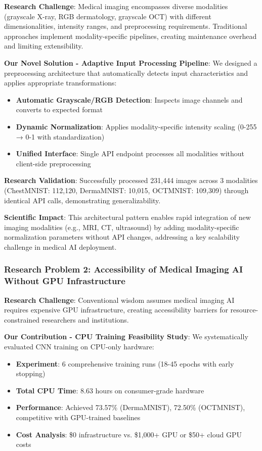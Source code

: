 \documentclass[12pt,a4paper]{article}
\begin{document}
\textbf{Research Challenge}: Medical imaging encompasses diverse modalities (grayscale X-ray, RGB dermatology, grayscale OCT) with different dimensionalities, intensity ranges, and preprocessing requirements. Traditional approaches implement modality-specific pipelines, creating maintenance overhead and limiting extensibility.

\textbf{Our Novel Solution - Adaptive Input Processing Pipeline}: We designed a preprocessing architecture that automatically detects input characteristics and applies appropriate transformations:

\begin{itemize}
    \item \textbf{Automatic Grayscale/RGB Detection}: Inspects image channels and converts to expected format
    \item \textbf{Dynamic Normalization}: Applies modality-specific intensity scaling (0-255 → 0-1 with standardization)
    \item \textbf{Unified Interface}: Single API endpoint processes all modalities without client-side preprocessing
\end{itemize}

\textbf{Research Validation}: Successfully processed 231,444 images across 3 modalities (ChestMNIST: 112,120, DermaMNIST: 10,015, OCTMNIST: 109,309) through identical API calls, demonstrating generalizability.

\textbf{Scientific Impact}: This architectural pattern enables rapid integration of new imaging modalities (e.g., MRI, CT, ultrasound) by adding modality-specific normalization parameters without API changes, addressing a key scalability challenge in medical AI deployment.

\subsubsection{Research Problem 2: Accessibility of Medical Imaging AI Without GPU Infrastructure}

\textbf{Research Challenge}: Conventional wisdom assumes medical imaging AI requires expensive GPU infrastructure, creating accessibility barriers for resource-constrained researchers and institutions.

\textbf{Our Contribution - CPU Training Feasibility Study}: We systematically evaluated CNN training on CPU-only hardware:

\begin{itemize}
    \item \textbf{Experiment}: 6 comprehensive training runs (18-45 epochs with early stopping)
    \item \textbf{Total CPU Time}: 8.63 hours on consumer-grade hardware
    \item \textbf{Performance}: Achieved 73.57\% (DermaMNIST), 72.50\% (OCTMNIST), competitive with GPU-trained baselines
    \item \textbf{Cost Analysis}: \$0 infrastructure vs. \$1,000+ GPU or \$50+ cloud GPU costs
\end{itemize}
\end{document}
